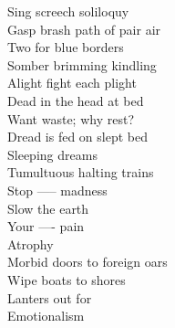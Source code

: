 Sing screech soliloquy\\
Gasp brash path of pair air\\
Two for blue borders\\
Somber brimming kindling\\
Alight fight each plight\\
Dead in the head at bed\\
Want waste; why rest?\\
Dread is fed on slept bed\\
Sleeping dreams\\
Tumultuous halting trains\\
Stop ----- madness\\
Slow the earth\\
Your ---- pain\\
Atrophy\\
Morbid doors to foreign oars\\
Wipe boats to shores\\
Lanters out for\\
Emotionalism\\

